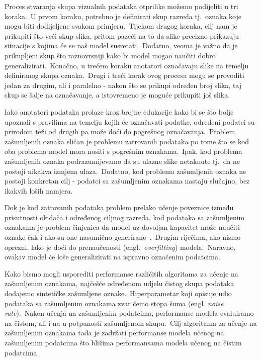 \documentclass[diplomskirad]{fer}
\begin{document}
Proces stvaranja skupa vizualnih podataka otprilike možemo podijeliti u tri koraka.\ U prvom koraku, potrebno je definirati skup razreda tj.\ oznaka koje mogu biti dodijeljene svakom primjeru.\ 
Tijekom drugog koraka, cilj nam je prikupiti što veći skup slika, pritom pazeći na to da slike precizno prikazuju situacije s kojima će se naš model susretati.\ Dodatno, veoma je važno da je prikupljeni skup što raznovrsniji kako bi model mogao naučiti dobro generalizirati.\ 
Konačno, u trećem koraku anotatori označavaju slike na temelju definiranog skupa oznaka.\ Drugi i treći korak ovog procesa mogu se provoditi jedan za drugim, ali i paralelno - nakon što se prikupi određen broj slika, taj skup se šalje na označavanje, a istovremeno je moguće prikupiti još slika.\ 
  
Iako anotatori podataka prolaze kroz brojne edukacije kako bi se što bolje upoznali s pravilima na temelju kojih će označavati podatke, određeni podatci su prirodom teži od drugih pa može doći do pogrešnog označavanja.\ 
Problem zašumljenih oznaka sličan je problemu zatrovanih podataka po tome što se kod oba problema model mora nositi s pogrešnim oznakama.\ Ipak, kod problema zašumljenih oznaka podrazumijevamo da su ulazne slike netaknute tj.\ da ne postoji nikakva izmjena ulaza.\ 
Dodatno, kod problema zašumljenih oznaka ne postoji konkretan cilj - podatci sa zašumljenim oznakama nastaju slučajno, bez ikakvih loših namjera.\ 
  
Dok je kod zatrovanih podataka problem prelako učenje poveznice između prisutnosti okidača i određenog ciljnog razreda, kod podataka sa zašumljenim oznakama je problem činjenica da model uz dovoljan kapacitet može naučiti oznake čak i ako su one nasumično generirane~\cite{zhang2016understanding}.\ 
Drugim riječima, ako nismo oprezni, lako je doći do prenaučenosti (engl.\ \textit{overfitting}) modela.\ Naravno, ovakav model će loše generalizirati na ispravno označenim podatcima.\ 
  
Kako bismo mogli usporediti performanse različitih algoritama za učenje na zašumljenim oznakama, najčešće određenom udjelu čistog skupa podataka dodajemo sintetičke zašumljene oznake.\ 
Hiperparametar koji opisuje udio podataka sa zašumljenim oznakama zvat ćemo stopa šuma (engl. \textit{noise rate}).\ Nakon učenja na zašumljenim podatcima, performanse modela evaluiramo na čistom, ali i na u potpunosti zašumljenom skupu.\ 
Cilj algoritama za učenje na zašumljenim oznakama tada je zadržati performanse modela učenog na zašumljenim podatcima što bližima performansama modela učenog na čistim podatcima.\ 
\end{document}
